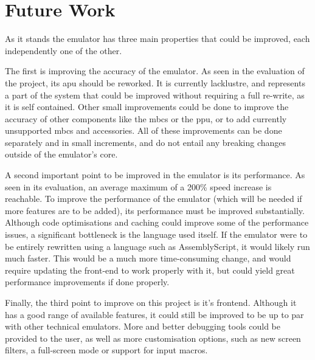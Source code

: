 \documentclass[11pt]{informatics-report}
\begin{document}
\section{Future Work}

As it stands the emulator has three main properties that could be improved, each independently one of the other.

The first is improving the accuracy of the emulator. As seen in the evaluation of the project, its \gls{apu} should be reworked. It is currently lacklustre, and represents a part of the system that could be improved without requiring a full re-write, as it is self contained. Other small improvements could be done to improve the accuracy of other components like the \glspl{mbc} or the \gls{ppu}, or to add currently unsupported \glspl{mbc} and accessories. All of these improvements can be done separately and in small increments, and do not entail any breaking changes outside of the emulator's core.

A second important point to be improved in the emulator is its performance. As seen in its evaluation, an average maximum of a 200\% speed increase is reachable. To improve the performance of the emulator (which will be needed if more features are to be added), its performance must be improved substantially. Although code optimisations and caching could improve some of the performance issues, a significant bottleneck is the language used itself. If the emulator were to be entirely rewritten using a language such as AssemblyScript, it would likely run much faster. This would be a much more time-consuming change, and would require updating the front-end to work properly with it, but could yield great performance improvements if done properly.

Finally, the third point to improve on this project is it's frontend. Although it has a good range of available features, it could still be improved to be up to par with other technical emulators. More and better debugging tools could be provided to the user, as well as more customisation options, such as new screen filters, a full-screen mode or support for input macros.

\clearpage

\printnoidxglossary[type=\acronymtype]

\printbibliography
{}
\end{document}

